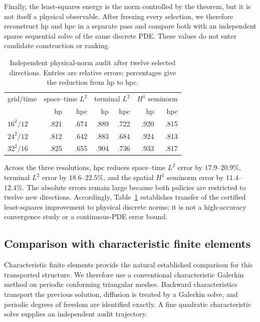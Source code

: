 \documentclass[11pt]{article}
\numberwithin{algorithm}{section}
\theoremstyle{definition}\newtheorem{definition}[theorem]{Definition}
\theoremstyle{remark}\newtheorem{remark}[theorem]{Remark}
\begin{document}
Finally, the least-squares energy is the norm controlled by the theorem, but
it is not itself a physical observable.  After freezing every selection, we
therefore reconstruct hp and hpc in a separate pass and compare both with an
independent sparse sequential solve of the same discrete PDE.  These values do
not enter candidate construction or ranking.

\begin{table}[h]
\centering
\caption{Independent physical-norm audit after twelve selected directions.
Entries are relative errors; percentages give the reduction from hp to hpc.}
\begin{tabular}{lrrrrrr}
\toprule
grid/time & \multicolumn{2}{c}{space--time $L^2$} &
\multicolumn{2}{c}{terminal $L^2$} & \multicolumn{2}{c}{$H^1$ seminorm}\\
& hp & hpc & hp & hpc & hp & hpc\\
\midrule
$16^2/12$ & .821 & .674 & .889 & .722 & .920 & .815\\
$24^2/12$ & .812 & .642 & .883 & .684 & .924 & .813\\
$32^2/16$ & .825 & .655 & .904 & .736 & .933 & .817\\
\bottomrule
\end{tabular}
\label{tab:physical-audit}
\end{table}

Across the three resolutions, hpc reduces space--time $L^2$ error by
$17.9$--$20.9\%$, terminal $L^2$ error by $18.6$--$22.5\%$, and the spatial
$H^1$ seminorm error by $11.4$--$12.4\%$.  The absolute errors remain large
because both policies are restricted to twelve new directions.  Accordingly,
Table~\ref{tab:physical-audit} establishes transfer of the certified
least-squares improvement to physical discrete norms; it is not a
high-accuracy convergence study or a continuous-PDE error bound.

\subsection{Comparison with characteristic finite elements}
Characteristic finite elements provide the natural established comparison
for this transported structure.  We therefore use a conventional characteristic
Galerkin method on periodic conforming triangular meshes.  Backward
characteristics transport the previous solution, diffusion is treated by a
Galerkin solve, and periodic degrees of freedom are identified exactly.  A
fine quadratic characteristic solve supplies an independent audit trajectory.
\end{document}
